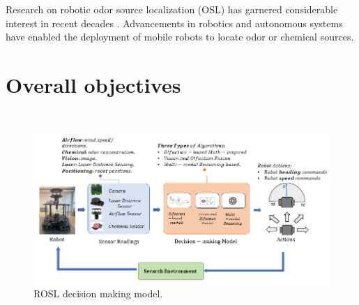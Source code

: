Research on robotic odor source localization (OSL) has garnered considerable interest in recent decades \cite{jing2021recent}. Advancements in robotics and autonomous systems have enabled the deployment of mobile robots to locate odor or chemical sources.


\section{Overall objectives}\label{Sec:overall_objectives}
\begin{figure}[h] %

\ \\
\vspace*{-.18in}

\begin{center}
\includegraphics[width=0.99\columnwidth]{Main/Figure/objective.png}\hspace*{0.04in}
\end{center}
\vspace{-.1in}

\caption
{ROSL decision making model.}
\label{fig:overall_objective}
\end{figure}

